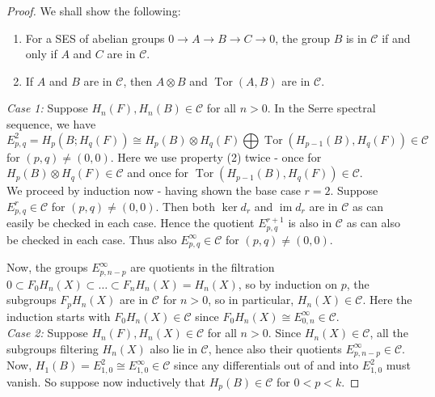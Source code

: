 \documentclass[reqno]{amsart}
\theoremstyle{definition}
\theoremstyle{remark}
\DeclareMathOperator{\im}{im}
\DeclareMathOperator{\Tor}{Tor}
\begin{document}
\begin{proof}
    We shall show the following:
    \begin{enumerate}
        \item For a SES of abelian groups $0 \to A\to B\to C\to 0$,
            the group $B$ is in $\mathcal{C}$ if and only
            if $A$ and $C$ are in $\mathcal{C}$.
        \item If $A$ and $B$ are in $\mathcal{C}$, then
            $A \otimes B$ and $\Tor (A,B)$ are in
            $\mathcal{C}$.
    \end{enumerate}

    \textit{Case 1:} Suppose
    $H_n(F), H_n(B) \in \mathcal{C}$ for all
    $n>0$. In the Serre spectral sequence, we have
    \[
    E_{p,q}^2 = H_p \left( B; H_q(F) \right) 
    \cong H_p (B) \otimes H_q(F) \bigoplus
    \Tor \left( H_{p-1}(B),H_q(F) \right) \in 
    \mathcal{C}
    \] 
    for $(p,q) \neq (0,0)$.
    Here we use property (2) twice - once
    for
    $H_p (B) \otimes H_q(F) \in \mathcal{C}$ and
    once for
    $\Tor \left( H_{p-1}(B), H_q(F) \right) \in \mathcal{C}$.\\
    
    We proceed by induction now - having
    shown the base case $r = 2$. Suppose
    $E_{p,q}^{r} \in \mathcal{C}$ for $(p,q) \neq (0,0)$.
    Then both $\ker d_r$ and $\im d_r$ are in
    $\mathcal{C}$ as can easily be checked in each case.
    Hence the quotient $E_{p,q}^{r+1}$ is also in $\mathcal{C}$ 
    as can also be checked in each case.
    Thus also $E_{p,q}^{\infty} \in \mathcal{C}$ 
    for $(p,q) \neq (0,0)$.

    Now, the groups $E_{p,n-p}^{\infty}$ are quotients
    in the filtration
    $0 \subset F_0 H_n(X) \subset 
    \ldots \subset F_n H_n(X) = H_n(X)$, so by
    induction on $p$, the subgroups
    $F_p H_n(X)$ are in $\mathcal{C}$ for $n>0$, so
    in particular, $H_n(X) \in \mathcal{C}$.
    Here the induction starts
    with $F_0 H_n (X) \in \mathcal{C}$ since
    $F_0 H_n(X) \cong E_{0,n}^{\infty} \in \mathcal{C}$.\\
    \linebreak
    \textit{Case 2:} Suppose
    $H_n(F), H_n(X) \in \mathcal{C}$ for
    all $n>0$. Since
    $H_n(X) \in \mathcal{C}$, all
    the subgroups filtering $H_n(X)$ also lie in
    $\mathcal{C}$, hence also their
    quotients
    $E_{p,n-p}^{\infty} \in \mathcal{C}$.
    Now,
    $H_1(B) = 
    E_{1,0}^2 \cong E_{1,0}^{\infty} \in \mathcal{C}$ since
    any differentials out of and into $E_{1,0}^2$ must vanish.
    So suppose now inductively that
    $H_p (B) \in \mathcal{C}$ for $0<p<k$.


\end{proof}
\end{document}
